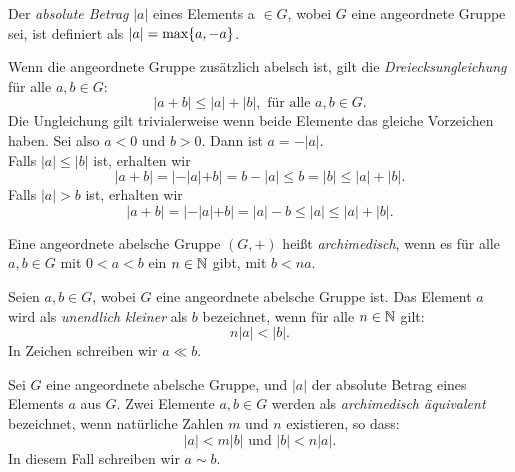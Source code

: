 \begin{defn} \label{betrag}
Der \textit{absolute Betrag} $|a|$ eines Elements a $\in  G$, wobei $G$ eine angeordnete Gruppe sei, ist definiert als $|a| = \textup{max}\lbrace a, -a \rbrace$.
\end{defn}

Wenn die angeordnete Gruppe zusätzlich abelsch ist, gilt die \textit{Dreiecksungleichung} für alle $a, b \in G$:
\[|a+ b | \le |a| + |b|, \text{ für alle } a, b \in G.\]
Die Ungleichung gilt trivialerweise wenn beide Elemente das gleiche Vorzeichen haben. Sei also $a < 0$ und $b > 0$. Dann ist $a= -|a|$.\\
Falls $|a|\le |b|$ ist, erhalten wir
\[ |a + b |= |-|a|+b| = b - |a| \le b = |b|\le|a| + |b|. \]
Falls $|a| >b$ ist, erhalten wir 
\[|a+b| = |-|a| +b| = |a| - b \le |a|\le |a| + |b|.\]  
%
% 
%
%
%
%
%
\begin{defn}\label{archim}
Eine angeordnete abelsche Gruppe $\left(G,+\right)$ heißt \textit{archimedisch}, wenn es für alle $a, b \in G$  mit $0 < a < b$ ein $n \in \mathbb{N} $ gibt, mit $b < na$.
\end{defn}
%
%
\begin{defn}\label{uek}
Seien $a, b \in G$, wobei $G$ eine angeordnete abelsche Gruppe ist. Das Element $a$ wird als \textit{unendlich kleiner} als $b$ bezeichnet, wenn für alle $  n \in \mathbb{N} $ gilt: 
\[n|a| < |b|.\]
In Zeichen schreiben wir $a \ll b$.
\end{defn}
%
\begin{defn}\label{aae}
Sei $G$ eine angeordnete abelsche Gruppe, und $|a|$ der absolute Betrag eines Elements $a$ aus $G$. Zwei Elemente $a,b \in G$ werden als \textit{archimedisch äquivalent} bezeichnet, wenn natürliche Zahlen $m$ und $n$ existieren, so dass: 
\[|a| < m|b| \text{ und } |b| < n|a|.\]
In diesem Fall schreiben wir $ a \sim b $. 
\end{defn}
%
